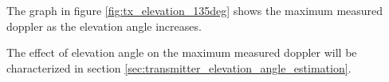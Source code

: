The graph in figure \ref{fig:tx_elevation_135deg} shows the maximum measured doppler as the elevation angle increases. 

The effect of elevation angle on the maximum measured doppler will be characterized in section \ref{sec:transmitter_elevation_angle_estimation}.



